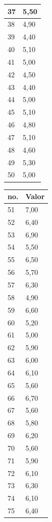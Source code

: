 \begin{table}[!ht]
\begin{tabular}{ |ll| }
37	&	5,50	\\ \hline
38	&	4,90	\\ \hline
39	&	4,40	\\ \hline
40	&	5,10	\\ \hline
41	&	5,00	\\ \hline
42	&	4,50	\\ \hline
43	&	4,40	\\ \hline
44	&	5,00	\\ \hline
45	&	5,10	\\ \hline
46	&	4,80	\\ \hline
47	&	5,10	\\ \hline
48	&	4,60	\\ \hline
49	&	5,30	\\ \hline
50	&	5,00	\\ \hline
\end{tabular}
\begin{tabular}{ |ll| }
\hline
 no. & Valor \\ \hline
51	&	7,00	\\ \hline
52	&	6,40	\\ \hline
53	&	6,90	\\ \hline
54	&	5,50	\\ \hline
55	&	6,50	\\ \hline
56	&	5,70	\\ \hline
57	&	6,30	\\ \hline
58	&	4,90	\\ \hline
59	&	6,60	\\ \hline
60	&	5,20	\\ \hline
61	&	5,00	\\ \hline
62	&	5,90	\\ \hline
63	&	6,00	\\ \hline
64	&	6,10	\\ \hline
65	&	5,60	\\ \hline
66	&	6,70	\\ \hline
67	&	5,60	\\ \hline
68	&	5,80	\\ \hline
69	&	6,20	\\ \hline
70	&	5,60	\\ \hline
71	&	5,90	\\ \hline
72	&	6,10	\\ \hline
73	&	6,30	\\ \hline
74	&	6,10	\\ \hline
75	&	6,40	\\ \hline
\end{tabular}
\begin{tabular}{ |ll| }

\end{tabular}
\end{table}
